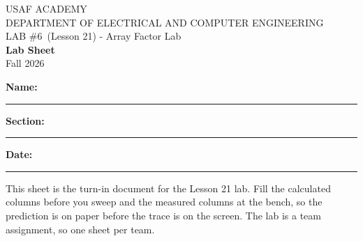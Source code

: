 \documentclass{exam}
\def\labNum{\labNumIn}
\def\labNum{6}
\def\thisterm{\thisTermIn}
\def\thisterm{Fall 2026}
\begin{document}
\pagestyle{headandfoot}   %



\begin{center}
USAF ACADEMY \\
DEPARTMENT OF ELECTRICAL AND COMPUTER ENGINEERING \\
LAB \#\labNum\ (Lesson 21) - Array Factor Lab \\
\textbf{Lab Sheet} \\
\thisterm \\[4mm]
\end{center}

\vspace{-4pt}
\textbf{Name:} \rule[-2pt]{2.6in}{0.4pt} \hfill
\textbf{Section:} \rule[-2pt]{0.9in}{0.4pt} \hfill
\textbf{Date:} \rule[-2pt]{1.1in}{0.4pt}

\vspace{4pt}


\vspace{2pt}

This sheet is the turn-in document for the Lesson 21 lab. Fill the calculated
columns before you sweep and the measured columns at the bench, so the
prediction is on paper before the trace is on the screen. The lab is a team
assignment, so one sheet per team.
\end{document}
